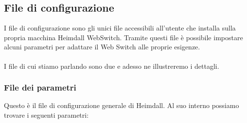 \documentclass[italian]{tktltiki2}
\begin{document}
\subsection{File di configurazione}
\label{sec:config}
I file di configurazione sono gli unici file accessibili all'utente che installa sulla propria macchina Heimdall WebSwitch. Tramite questi file è possibile impostare alcuni parametri per adattare il Web Switch alle proprie esigenze.
\\
\\
I file di cui stiamo parlando sono due e adesso ne illustreremo i dettagli.
\subsubsection{File dei parametri}
\label{sec:config_parser}
Questo è il file di configurazione generale di Heimdall. Al suo interno possiamo trovare i seguenti parametri:
\end{document}

